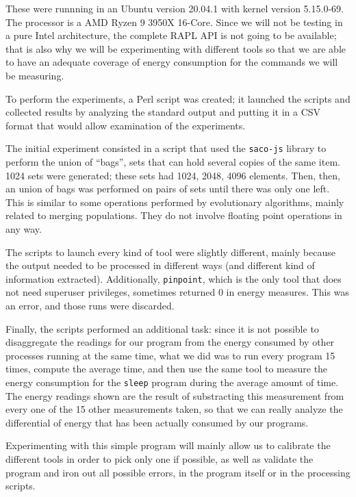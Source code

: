 \documentclass[a4paper,twoside]{article}
\begin{document}
These were runnning in an Ubuntu version 20.04.1 with kernel version
5.15.0-69. The processor is a AMD Ryzen 9 3950X 16-Core. Since we will
not be testing in a pure Intel architecture, the complete RAPL API is
not going to be available; that is also why we will be experimenting
with different tools so that we are able to have an adequate coverage
of energy consumption for the commands we will be measuring.

To perform the experiments, a Perl script was created; it launched the scripts
and collected results by analyzing the standard output and putting it in a CSV
format that would allow examination of the experiments.

The initial experiment consisted in a script that used the \texttt{saco-js}
library to perform the union of ``bags'', sets that can hold several copies of
the same item. 1024 sets were generated; these sets had 1024, 2048, 4096
elements. Then, then, an union of bags was performed on pairs of sets until
there was only one left. This is similar to some operations performed by
evolutionary algorithms, mainly related to merging populations. They do not
involve floating point operations in any way.

The scripts to launch every kind of tool were slightly different, mainly because
the output needed to be processed in different ways (and different kind of
information extracted). Additionally, \texttt{pinpoint}, which is the only tool
that does not need superuser privileges, sometimes returned 0 in energy
measures. This was an error, and those runs were discarded.

Finally, the scripts performed an additional task: since it is not possible to
disaggregate the readings for our program from the energy consumed by other
processes running at the same time, what we did was to run every program 15
times, compute the average time, and then use the same tool to measure the
energy consumption for the \texttt{sleep} program during the average amount of
time. The energy readings shown are the result of substracting this measurement
from every one of the 15 other measurements taken, so that we can really analyze
the differential of energy that has been actually consumed by our programs.

Experimenting with this simple program will mainly allow us to calibrate the
different tools in order to pick only one if possible, as well as validate the
program and iron out all possible errors, in the program itself or in the
processing scripts.
\end{document}
